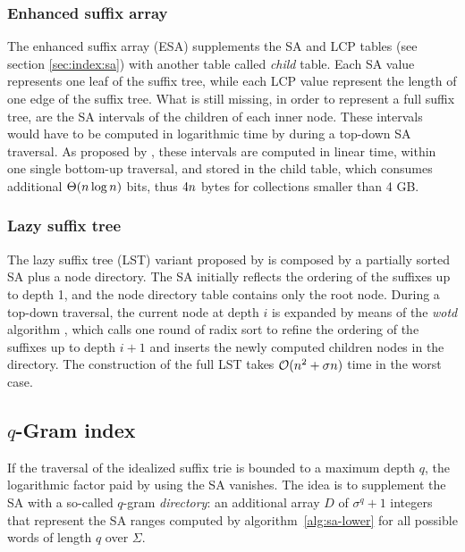 \subsubsection{Enhanced suffix array}
\label{sec:index:esa}

The enhanced suffix array (ESA) \citep{Abouelhoda2004} supplements the SA and LCP tables (see section \ref{sec:index:sa}) with another table called \emph{child} table.
Each SA value represents one leaf of the suffix tree, while each LCP value represent the length of one edge of the suffix tree.
What is still missing, in order to represent a full suffix tree, are the SA intervals of the children of each inner node.
These intervals would have to be computed in logarithmic time by  during a top-down SA traversal.
As proposed by \cite{Abouelhoda2004}, these intervals are computed in linear time, within one single bottom-up traversal, and stored in the child table, which consumes additional $\Theta(n \log n)$ bits, thus $4n$ bytes for collections smaller than 4 GB.

\subsubsection{Lazy suffix tree}
\label{sec:index:lst}

The lazy suffix tree (LST) \citep{Giegerich1999} variant proposed by \citep{Weese2013} is composed by a partially sorted SA plus a node directory.
The SA initially reflects the ordering of the suffixes up to depth 1, and the node directory table contains only the root node.
During a top-down traversal, the current node at depth $i$ is expanded by means of the \emph{wotd} algorithm \citep{Giegerich1999}, which calls one round of radix sort to refine the ordering of the suffixes up to depth $i + 1$ and inserts the newly computed children nodes in the directory.
The construction of the full LST takes $\mathcal{O}(n^2 + \sigma n)$ time in the worst case.

\subsection{$q$-Gram index}
\label{sec:index:qgram}

If the traversal of the idealized suffix trie is bounded to a maximum depth $q$, the logarithmic factor paid by using the SA vanishes.
The idea is to supplement the SA with a so-called $q$-gram \emph{directory}: an additional array $D$ of $\sigma^q + 1$ integers that represent the SA ranges computed by algorithm~\ref{alg:sa-lower} for all possible words of length $q$ over $\Sigma$.

